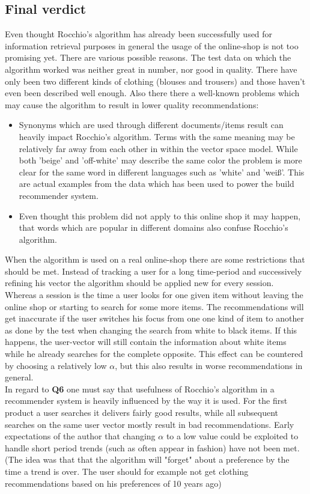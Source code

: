 \subsection{Final verdict}
Even thought Rocchio's algorithm has already been successfully used for information retrieval purposes in general \citep[p.~183]{manning:2009} the usage of the online-shop is not too promising yet.
There are various possible reasons.
The test data on which the algorithm worked was neither great in number, nor good in quality.
There have only been two different kinds of clothing (blouses and trousers) and those haven't even been described well enough.
Also there there a well-known problems which may cause the algorithm to result in lower quality recommendations:
\begin{itemize}
    \item Synonyms which are used through different documents/items result can heavily impact Rocchio's algorithm.
        Terms with the same meaning may be relatively far away from each other in within the vector space model.
        \citep[p.~184]{manning:2009}
        While both 'beige' and 'off-white' may describe the same color the problem is more clear for the same word in different languages such as 'white' and 'wei\ss{}'.
        This are actual examples from the data which has been used to power the build recommender system.

    \item Even thought this problem did not apply to this online shop it may happen, that words which are popular in different domains also confuse Rocchio's algorithm.
    \citep[p.~184]{manning:2009}
\end{itemize}

\noindent
When the algorithm is used on a real online-shop there are some restrictions that should be met.
Instead of tracking a user for a long time-period and successively refining his vector the algorithm should be applied new for every session.
Whereas a session is the time a user looks for one given item without leaving the online shop or starting to search for some more items.
The recommendations will get inaccurate if the user switches his focus from one one kind of item to another as done by the test when changing the search from white to black items.
If this happens, the user-vector will still contain the information about white items while he already searches for the complete opposite.
This effect can be countered by choosing a relatively low $\alpha$, but this also results in worse recommendations in general.
\\
In regard to \textbf{Q6} one must say that usefulness of Rocchio's algorithm in a recommender system is heavily influenced by the way it is used.
For the first product a user searches it delivers fairly good results, while all subsequent searches on the same user vector mostly result in bad recommendations.
Early expectations of the author that changing $\alpha$ to a low value could be exploited to handle short period trends (such as often appear in fashion) have not been met.
(The idea was that that the algorithm will "forget" about a preference by the time a trend is over. The user should for example not get clothing recommendations based on his preferences of 10 years ago)


